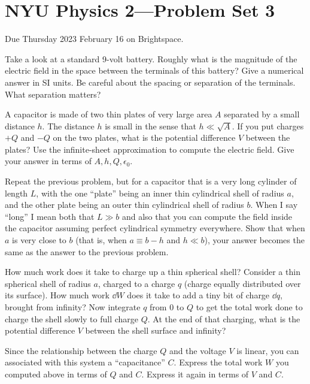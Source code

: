 \documentclass[12pt]{article}
\begin{document}
\section*{NYU Physics 2---Problem Set 3}

Due Thursday 2023 February 16 on Brightspace.

\startproblem%
Take a look at a standard 9-volt battery.
Roughly what is the magnitude of the electric field in the space
between the terminals of this battery? Give a numerical answer in
SI units.
Be careful about the spacing or separation of the terminals.
What separation matters?

\startproblem%
A capacitor is made of two thin plates of very large area $A$
separated by a small distance $h$. The distance $h$ is small in the sense
that $h\ll \sqrt{A}$. If you put charges $+Q$ and $-Q$ on the
two plates, what is the potential difference $V$ between the plates?
Use the infinite-sheet approximation to compute the electric field.
Give your answer in terms of $A, h, Q, \epsilon_0$.

\startproblem%
Repeat the previous problem, but for a capacitor that is a very long
cylinder of length $L$, with the one ``plate'' being an inner thin
cylindrical shell of radius $a$, and the other plate being an outer
thin cylindrical shell of radius $b$. When I say ``long'' I mean both that
$L\gg b$ and also that you
can compute the field inside the capacitor assuming perfect
cylindrical symmetry everywhere. Show that when $a$ is very close to $b$ (that
is, when $a \equiv b - h$ and $h \ll b$), your answer becomes the same
as the answer to the previous problem.

\startproblem%
How much work does it take to charge up a thin spherical shell?
Consider a thin spherical shell of radius $a$, charged to a charge
$q$ (charge equally distributed over its surface). How much work
$\dd W$ does it take to add a tiny bit of charge $\dd q$, brought
from infinity? Now integrate $q$ from $0$ to $Q$ to get the total
work done to charge the shell slowly to full charge $Q$. At the
end of that charging, what is the potential difference $V$ between
the shell surface and infinity?

Since the relationship between the charge $Q$ and the voltage $V$ is
linear, you can associated with this system a ``capacitance''
$C$. Express the total work $W$ you computed above in terms of $Q$ and
$C$. Express it again in terms of $V$ and $C$.
\end{document}

